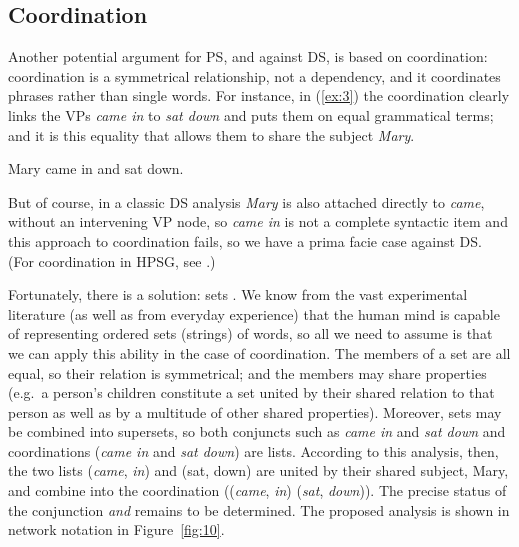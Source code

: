 \documentclass[output=paper
	        ,collection
	        ,collectionchapter
 	        ,biblatex
                ,babelshorthands
                ,newtxmath
                ,draftmode
                ,colorlinks, citecolor=brown
]{./langsci/langscibook}
\begin{document}
\subsection{Coordination}
\label{sec:4.2}

Another potential argument for PS, and against DS, is based on coordination: coordination is a symmetrical relationship, not a dependency, and it coordinates phrases rather than single words. For instance, in (\ref{ex:3}) the coordination clearly links the VPs \emph{came in} to \emph{sat down} and puts them on equal grammatical terms; and it is this equality that allows them to share the subject \emph{Mary}.

\begin{exe}
	\ex \label{ex:3} Mary came in and sat down.
\end{exe}

But of course, in a classic DS analysis \emph{Mary} is also attached directly to \emph{came}, without an intervening VP node, so \emph{came in} is not a complete syntactic item and this approach to coordination fails, so we have a prima facie case against DS. (For coordination in HPSG, see .)

Fortunately, there is a solution: sets \citep[404--421]{Hudson90a-u}. We know from the vast experimental literature (as well as from everyday experience) that the human mind is capable of representing ordered sets (strings) of words, so all we need to assume is that we can apply this ability in the case of coordination. The members of a set are all equal, so their relation is symmetrical; and the members may share properties (e.g.\ a person’s children constitute a set united by their shared relation to that person as well as by a multitude of other shared properties). Moreover, sets may be combined into supersets, so both conjuncts such as \emph{came in} and \emph{sat down} and coordinations (\emph{came in} and \emph{sat down}) are lists. According to this analysis, then, the two lists (\emph{came}, \emph{in}) and (sat, down) are united by their shared subject, Mary, and combine into the coordination ((\emph{came}, \emph{in}) (\emph{sat}, \emph{down})). The precise status of the conjunction \emph{and} remains to be determined. The proposed analysis is shown in network notation in Figure~\ref{fig:10}.
\end{document}
